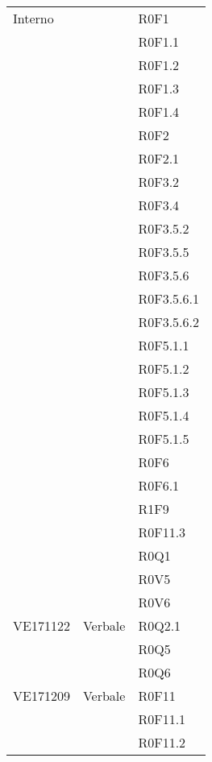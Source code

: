 \documentclass[AnalisiDeiRequisiti.tex]{subfiles}
\begin{document}
\begin{longtable}[H]{|p{2cm}|p{5cm}|p{5cm}|}
	Interno & & R0F1 \\
	& & R0F1.1 \\
	& & R0F1.2 \\
	& & R0F1.3 \\
	& & R0F1.4 \\
	& & R0F2 \\
	& & R0F2.1 \\
	& & R0F3.2 \\
	& & R0F3.4 \\
	& & R0F3.5.2 \\
	& & R0F3.5.5 \\
	& & R0F3.5.6 \\
	& & R0F3.5.6.1 \\
	& & R0F3.5.6.2 \\
	& & R0F5.1.1 \\
	& & R0F5.1.2 \\
	& & R0F5.1.3 \\
	& & R0F5.1.4 \\
	& & R0F5.1.5 \\
	& & R0F6 \\
	& & R0F6.1 \\
	& & R1F9 \\
	& & R0F11.3 \\
	& & R0Q1 \\
	& & R0V5 \\
	& & R0V6 \\ \hline
	
	VE171122 & Verbale & R0Q2.1 \\
	& & R0Q5 \\
	& & R0Q6 \\ \hline
	
	VE171209 & Verbale & R0F11 \\
	& & R0F11.1 \\
	& & R0F11.2 \\ \hline
	

\end{longtable}
\end{document}
